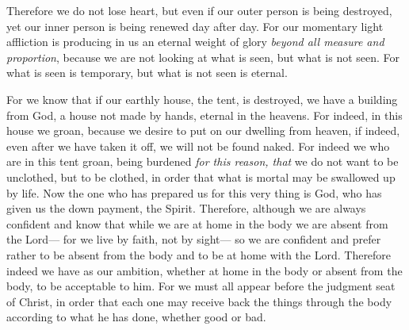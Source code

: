 \begin{biblechapter}
\verse Therefore we do not lose heart, but even if our outer person is being destroyed, yet our inner person is being renewed day after day.
\verse For our momentary light affliction is producing in us an eternal weight of glory \textit{beyond all measure and proportion},
\verse because we are not looking at what is seen, but what is not seen. For what is seen is temporary, but what is not seen is eternal.
\end{biblechapter}

\begin{biblechapter} %
 For we know that if our earthly house, the tent, is destroyed, we have a building from God, a house not made by hands, eternal in the heavens.
\verse For indeed, in this house we groan, because we desire to put on our dwelling from heaven,
\verse if indeed, even after we have taken it off, we will not be found naked.
\verse For indeed we who are in this tent groan, being burdened \textit{for this reason, that} we do not want to be unclothed, but to be clothed, in order that what is mortal may be swallowed up by life.
\verse Now the one who has prepared us for this very thing is God, who has given us the down payment, the Spirit.
\verse Therefore, although we are always confident and know that while we are at home in the body we are absent from the Lord—
\verse for we live by faith, not by sight—
\verse so we are confident and prefer rather to be absent from the body and to be at home with the Lord.
\verse Therefore indeed we have as our ambition, whether at home in the body or absent from the body, to be acceptable to him.
\verse For we must all appear before the judgment seat of Christ, in order that each one may receive back the things through the body according to what he has done, whether good or bad.

\end{biblechapter}
